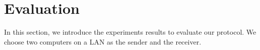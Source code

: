 \section{Evaluation}
In this section, we introduce the experiments results to evaluate our protocol.
We choose two computers on a LAN as the sender and the receiver. 
\label{s:dstream:evaluation}
\begin{comment}
    \subsection{CPU Usage of the Sender}
    \begin{table}[b]
    \centering
    \begin{tabular}{|c|c|c|}
    \hline
    &Sender-driven &Receiver-driven\\
    \hline
    send    base mesh           & 1.40s & 1.13s  \\
    decode  IDs                 & -     & 1.55s  \\
    search vertex split         & 1.85s  & 1.85s \\
    determine visibility        & 0.41s & - \\
    update vertex front         & 1.41s & - \\
    encode IDs                  & 0.94s & - \\
    others                      &0.16s  & 0.16s\\
    \hline
    \end{tabular}
    \caption{Comparison of CPU usage of the sender.
    \label{t:dstream:cpu}}
    \end{table}
    We compare the CPU usage of the sender in sender-driven
    protocol and receiver-driven protocol after all vertex splits
    are received (see Table \ref{t:dstream:cpu}). 
    The implementation of the sender-driven protocol is modified from
    our receiver-driven protocol using the visibility determination
    algorithm from Kim et al. \cite{kim:view}. %
    In both experiments, the client changes its viewpoints exactly the
    same way.
    A computer with an Intel Core 2 Duo 2.4 GHz CPU and 4 GB memory is
    used as the sender.  We profile the code five times 
    with Google CPU profiler and take the average value.
    We can see that the receiver-driven protocol reduces the CPU usage
    of the sender by 24\% since we remove the processes for determining the visibility and updating the vertex front on the sender. 
\end{comment}
